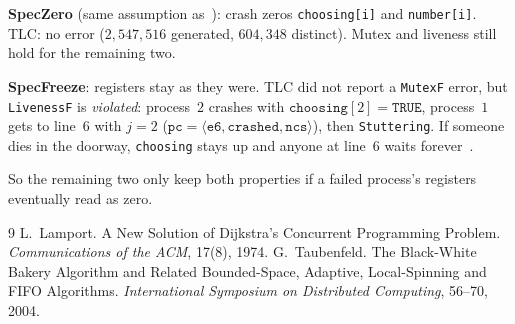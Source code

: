 \documentclass{article}
\newcommand{\tuple}[1]{\langle #1\rangle}
\begin{document}
\textbf{SpecZero} (same assumption as~\cite{lamport}): crash zeros \texttt{choosing[i]} and \texttt{number[i]}. TLC: no error ($2{,}547{,}516$ generated, $604{,}348$ distinct). Mutex and liveness still hold for the remaining two.

\textbf{SpecFreeze}: registers stay as they were. TLC did not report a \texttt{MutexF} error, but \texttt{LivenessF} is \emph{violated}: process~$2$ crashes with $\texttt{choosing}[2]=\texttt{TRUE}$, process~$1$ gets to line~6 with $j=2$ ($\texttt{pc}=\tuple{\texttt{e6},\texttt{crashed},\texttt{ncs}}$), then \texttt{Stuttering}. If someone dies in the doorway, \texttt{choosing} stays up and anyone at line~6 waits forever~\cite{lamport}.

So the remaining two only keep both properties if a failed process's registers eventually read as zero.

\begin{thebibliography}{9}
 L.~Lamport. A New Solution of Dijkstra's Concurrent Programming Problem. \emph{Communications of the ACM}, 17(8), 1974.
 G.~Taubenfeld. The Black-White Bakery Algorithm and Related Bounded-Space, Adaptive, Local-Spinning and FIFO Algorithms. \emph{International Symposium on Distributed Computing}, 56--70, 2004.
\end{thebibliography}
\end{document}
